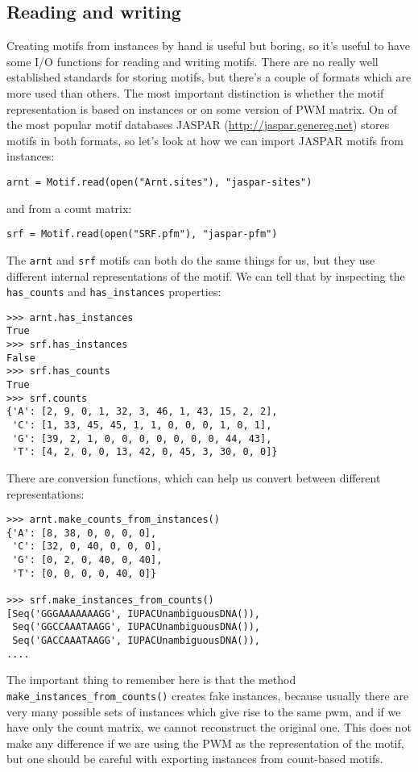 \documentclass{article}
\begin{document}
\subsection{Reading and writing}
\label{sec:io}

Creating motifs from instances by hand is useful but boring, so it's
useful to have some I/O functions for reading and writing
motifs. There are no really well established standards for storing
motifs, but there's a couple of formats which are more used than
others. The most important distinction is whether the motif
representation is based on instances or on some version of PWM matrix.
On of the most popular motif databases JASPAR
(\url{http://jaspar.genereg.net}) stores motifs in both formats, so
let's look at how we can import JASPAR motifs from instances:
\begin{verbatim}
arnt = Motif.read(open("Arnt.sites"), "jaspar-sites")
\end{verbatim}
and from a count matrix:
\begin{verbatim}
srf = Motif.read(open("SRF.pfm"), "jaspar-pfm")
\end{verbatim}

The \verb|arnt| and \verb|srf| motifs can both do the same things for
us, but they use different internal representations of the motif. We
can tell that by inspecting the \verb|has_counts| and
\verb|has_instances| properties:
\begin{verbatim}
>>> arnt.has_instances
True
>>> srf.has_instances
False
>>> srf.has_counts
True
>>> srf.counts
{'A': [2, 9, 0, 1, 32, 3, 46, 1, 43, 15, 2, 2],
 'C': [1, 33, 45, 45, 1, 1, 0, 0, 0, 1, 0, 1],
 'G': [39, 2, 1, 0, 0, 0, 0, 0, 0, 0, 44, 43],
 'T': [4, 2, 0, 0, 13, 42, 0, 45, 3, 30, 0, 0]}
\end{verbatim}

There are conversion functions, which can help us convert between
different representations:
\begin{verbatim}
>>> arnt.make_counts_from_instances()
{'A': [8, 38, 0, 0, 0, 0],
 'C': [32, 0, 40, 0, 0, 0],
 'G': [0, 2, 0, 40, 0, 40],
 'T': [0, 0, 0, 0, 40, 0]}

>>> srf.make_instances_from_counts()
[Seq('GGGAAAAAAAGG', IUPACUnambiguousDNA()),
 Seq('GGCCAAATAAGG', IUPACUnambiguousDNA()),
 Seq('GACCAAATAAGG', IUPACUnambiguousDNA()),
....
\end{verbatim}
The important thing to remember here is that the method
\verb|make_instances_from_counts()| creates fake instances, because
usually there are very many possible sets of instances which give rise
to the same pwm, and if we have only the count matrix, we cannot
reconstruct the original one. This does not make any difference if we
are using the PWM as the representation of the motif, but one should
be careful with exporting instances from count-based motifs.
\end{document}
